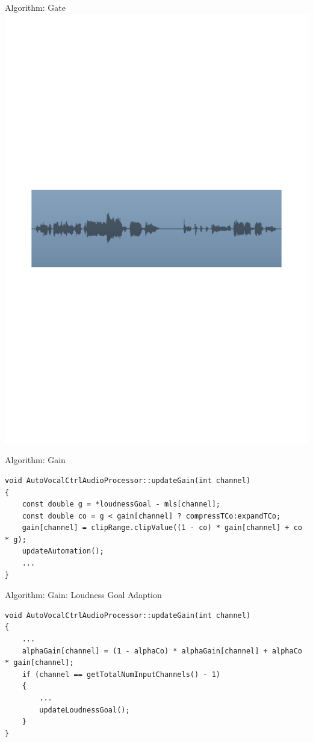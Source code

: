 \begin{frame}[c]{Algorithm: Gate}{}
	\includegraphics[scale=0.6]{images/wave}
	\centering
\end{frame}

\begin{frame}[fragile]{Algorithm: Gain}{}
	\lstset{language=C++}
	\begin{lstlisting}[basicstyle=\tiny]
void AutoVocalCtrlAudioProcessor::updateGain(int channel)
{
    const double g = *loudnessGoal - mls[channel];
    const double co = g < gain[channel] ? compressTCo:expandTCo;
    gain[channel] = clipRange.clipValue((1 - co) * gain[channel] + co * g);
    updateAutomation();
    ...
}
	\end{lstlisting}
\end{frame}

\begin{frame}[fragile]{Algorithm: Gain: Loudness Goal Adaption}{}
	\lstset{language=C++}
	\begin{lstlisting}[basicstyle=\tiny]
void AutoVocalCtrlAudioProcessor::updateGain(int channel)
{
    ...
    alphaGain[channel] = (1 - alphaCo) * alphaGain[channel] + alphaCo * gain[channel];
    if (channel == getTotalNumInputChannels() - 1)
    {
        ...
        updateLoudnessGoal();
    }
}
	\end{lstlisting}
\end{frame}

